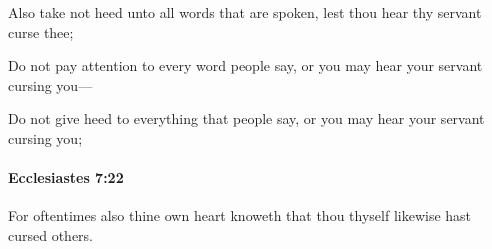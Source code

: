 			\begin{versebox}
					\item[BHS] 
					\item[LXX] 
					\item[ASV] Also take not heed unto all words that are spoken, lest thou hear thy servant curse thee;
					\item[NIV] Do not pay attention to every word people say, or you may hear your servant cursing you—
					\item[NRSV] Do not give heed to everything that people say, or you may hear your servant cursing you;
			\end{versebox}

		\paragraph{Ecclesiastes 7:22} %
			\label{ECCLESIASTES-7-22}

			For oftentimes also thine own heart knoweth that thou thyself likewise hast cursed others.

